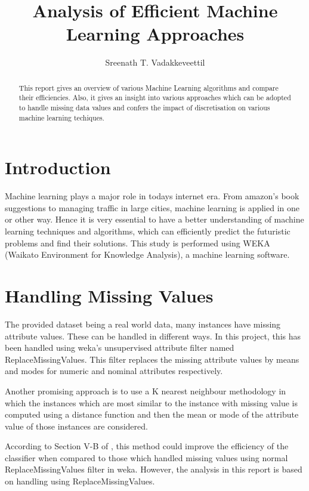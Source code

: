 \documentclass[11pt]{article}
\title{Analysis of Efficient Machine Learning Approaches}
\author
{Sreenath T. Vadakkeveettil}
\begin{document}
\maketitle


\begin{abstract}
This report gives an overview of various Machine Learning algorithms and compare their efficiencies. Also, it gives an insight into various approaches which can be adopted to handle missing data values and confers the impact of discretisation on various machine learning techiques.  
\end{abstract}

\section{Introduction}
Machine learning plays a major role in todays internet era. From amazon's book suggestions to managing traffic in large cities, machine learning is applied in one or other way. Hence it is very essential to have a better understanding of machine learning techniques and algorithms, which can efficiently predict the futuristic problems and find their solutions. This study is performed using WEKA (Waikato Environment for Knowledge Analysis), a machine learning software.     

\section{Handling Missing Values}
The provided dataset being a real world data, many instances have missing attribute values. These can be handled in different ways. In this project, this has been handled using weka's unsupervised attribute filter named ReplaceMissingValues. This filter replaces the missing attribute values by means and modes for numeric and nominal attributes respectively. 

Another promising approach is to use a K nearest neighbour methodology in which the instances which are most similar to the instance with missing value is computed using a distance function and then the mean or mode of the attribute value of those instances are considered. 

According to Section V-B of  , this method could improve the efficiency of the classifier when compared to those which handled missing values using normal ReplaceMissingValues filter in weka. However, the analysis in this report is based on handling using ReplaceMissingValues.  
\end{document}
